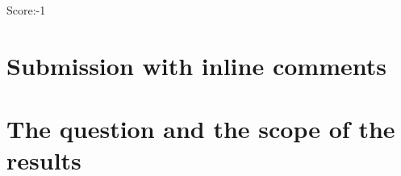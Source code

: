 \documentclass[11pt]{article}
\theoremstyle{definition}
\theoremstyle{remark}
\newcommand{\eps}{\varepsilon}
\begin{document}
\noindent Score:-1



\newpage
\section{Submission with inline comments}


\begin{abstract}
Let $X$ be a smooth vector field on a compact connected manifold without boundary, and suppose that every scalar distribution $u$ is smooth whenever $Xu$ is smooth. The question is whether the generated flow has zero topological entropy. We prove that the scalar kernel consists of constants, the smooth range of $X$ is closed, and the flow is nonwandering. We give two approximation criteria for a positive smooth invariant density. Fix a normalized Riemannian density $\rho$ and its Laplacian $\Delta$. For the stationary probability densities $a_\eps\rho$ of $X+\eps\Delta$, we prove $\eps\|\log a_\eps\|_\infty\to0$; boundedness of $-\int_M\log a_\eps\,\rho$ along a sequence $\eps\downarrow0$ is a stronger condition, equivalent here to existence of a positive smooth invariant density. We also prove a conditional entropy criterion and an exact suspension reduction. These results do not establish zero entropy in general: construction of an invariant density and the subsequent entropy implication remain unresolved by the arguments given here.
\end{abstract}

\section{The question and the scope of the results}
\end{document}
